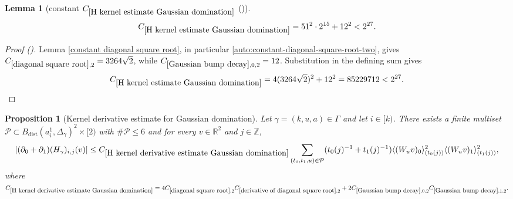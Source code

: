 \documentclass[12pt,reqno]{amsart}
\newcommand{\auto}{{({\tiny\faCar})}}
\theoremstyle{plain}
\newtheorem{lemma}[theorem]{Lemma}
\newtheorem{proposition}[theorem]{Proposition}
\numberwithin{equation}{section}
\theoremstyle{remark}
\newcommand{\uses}[1]{}
\newcommand{\usesdefs}[1]{}
\newcommand{\Z}{{\mathbb Z}}
\newcommand{\R}{{\mathbb R}}
\begin{document}
\begin{lemma}[constant $C_{\ref{H kernel estimate Gaussian domination}}$ \auto]\label{constant H kernel estimate Gaussian domination}\uses{constant diagonal square root,diagonal square root,Gaussian bump decay,H kernel estimate Gaussian domination}\usesdefs{}
\begin{equation}\label{constant H kernel estimate Gaussian domination bound}
C_{\ref{H kernel estimate Gaussian domination}}
=51^2\cdot2^{15}+12^2<2^{27}.
\end{equation}
\end{lemma}
\begin{proof}[Proof \auto]
Lemma \ref{constant diagonal square root}, in particular \eqref{auto:constant-diagonal-square-root-two}, gives
$C_{\ref{diagonal square root},2}=3264\sqrt2$, while
$C_{\ref{Gaussian bump decay},0,2}=12$. Substitution in the defining sum gives
\[
C_{\ref{H kernel estimate Gaussian domination}}
=4(3264\sqrt2)^2+12^2
=85229712<2^{27}.
\]
\end{proof}


\begin{proposition}[Kernel derivative estimate for Gaussian domination]\label{H kernel derivative estimate Gaussian domination}\uses{H kernel estimate Gaussian domination,diagonal square root,derivative of diagonal square root,Gaussian bump decay}\usesdefs{bracket bump,closed balls in A,geometric parameters,auto:unitary-matrices-definition,2D Gaussians,auto:Gaussian-difference-kernel-definition,s multiplier,H multiplier}
Let $\gamma=(k,u,a)\in \Gamma$ and let $i\in [k)$.
There exists a finite multiset $\mathcal{P}\subset B_{\mathrm{dist}}(a_i^1,\Delta_\gamma)^2\times [2)$ with $\#\mathcal{P}\le 6$ and for every $v\in \R^2$ and $j\in\Z$,
    \begin{equation}\label{auto:H-kernel-derivative-Gaussian-domination}|(\partial_0+\partial_1)(H_\gamma)_{i,j}(v)| \le C_{\ref{H kernel derivative estimate Gaussian domination}} \sum_{(t_0,t_1,u)\in\mathcal{P}} (t_0(j)^{-1} + t_1(j)^{-1}) \langle (W_u v)_0\rangle_{(t_0(j))}^2 \langle (W_u v)_1\rangle_{(t_1(j))}^2, \end{equation}
where $
C_{\ref{H kernel derivative estimate Gaussian domination}}
=
4C_{\ref{diagonal square root},2}
C_{\ref{derivative of diagonal square root},2}
+
2C_{\ref{Gaussian bump decay},0,2}
C_{\ref{Gaussian bump decay},1,2}.
$
\end{proposition}
\end{document}
